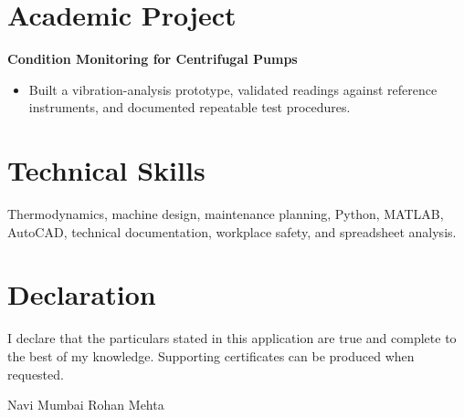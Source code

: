 \documentclass[11pt,a4paper]{article}
\begin{document}
\section{Academic Project}
\textbf{Condition Monitoring for Centrifugal Pumps}
\begin{itemize}
  \item Built a vibration-analysis prototype, validated readings against reference instruments, and documented repeatable test procedures.
\end{itemize}

\section{Technical Skills}
Thermodynamics, machine design, maintenance planning, Python, MATLAB, AutoCAD,
technical documentation, workplace safety, and spreadsheet analysis.

\section{Declaration}
I declare that the particulars stated in this application are true and complete
to the best of my knowledge. Supporting certificates can be produced when requested.

\vspace{8pt}
\noindent Navi Mumbai \hfill Rohan Mehta
\end{document}
